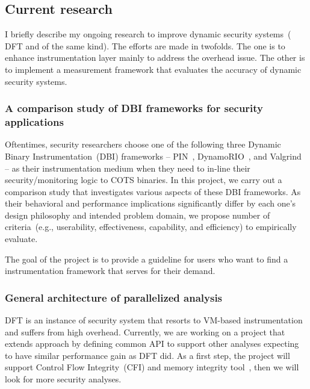 \documentclass[letterpaper, 10pt]{article}
\begin{document}
\begin{small}
\subsection*{Current research} %
%
%

I briefly describe my ongoing research to improve dynamic security systems~(\ie
DFT and of the same kind). The efforts are made in twofolds.  The one is to enhance
instrumentation layer mainly to address the overhead issue. The other is to
implement a measurement framework that evaluates the accuracy of dynamic
security systems. 


\subsubsection*{A comparison study of DBI frameworks for security applications}
%
Oftentimes, security researchers choose one of the following three Dynamic
Binary Instrumentation~(DBI) frameworks -- PIN~\cite{pin},
DynamoRIO~\cite{dynamorio}, and Valgrind~\cite{valgrind} -- as their
instrumentation medium when they need to in-line their security/monitoring
logic to COTS binaries.
%
In this project, we carry out a comparison study that investigates various
aspects of these DBI frameworks. As their behavioral and performance
implications significantly differ by each one's design philosophy and intended
problem domain, we propose number of criteria~(e.g., userability,
effectiveness, capability, and efficiency) to empirically evaluate.

%
The goal of the project is to provide a guideline for users who want to find a
instrumentation framework that serves for their demand.

\subsubsection*{General architecture of parallelized analysis} 
%
DFT is an instance of security system that resorts to VM-based instrumentation
and suffers from high overhead.
%
Currently, we are working on a project that extends \SR approach by defining
common API to support other analyses expecting to have similar performance gain
as DFT did. 
%
As a first step, the project will support Control Flow Integrity~(CFI) and
memory integrity tool~\cite{memcheck}, then we will look for more security
analyses.


\end{small}
\end{document}
